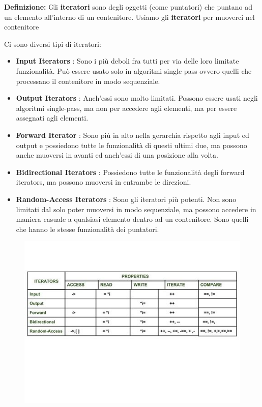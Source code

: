 \textsf{\small \textbf{Definizione: } Gli \textbf{iteratori} sono degli oggetti (come puntatori) che puntano ad un elemento all'interno di un contenitore. Usiamo gli \textbf{iteratori} per muoverci nel contenitore } \break

\textsf{\small Ci sono diversi tipi di iteratori: } \\

\begin{itemize}
	\item \textsf{\small \textbf{Input Iterators} : Sono i più deboli fra tutti per via delle loro limitate funzionalità. Può essere usato solo in algoritmi single-pass ovvero quelli che processano il contenitore in modo sequenziale.}
	\item \textsf{\small \textbf{Output Iterators} : Anch'essi sono molto limitati. Possono essere usati negli algoritmi single-pass, ma non per accedere agli elementi, ma per essere assegnati agli elementi.}
	\item \textsf{\small \textbf{Forward Iterator} : Sono più in alto nella gerarchia rispetto agli input ed output e possiedono tutte le funzionalità di questi ultimi due, ma possono anche muoversi in avanti ed anch'essi di una posizione alla volta.}
	\item \textsf{\small \textbf{Bidirectional Iterators} : Possiedono tutte le funzionalità degli forward iterators, ma possono muoversi in entrambe le direzioni.}
	\item \textsf{\small \textbf{Random-Access Iterators} : Sono gli iteratori più potenti. Non sono limitati dal solo poter muoversi in modo sequenziale, ma possono accedere in maniera casuale a qualsiasi elemento dentro ad un contenitore. Sono quelli che hanno le stesse funzionalità dei puntatori.}
\end{itemize}

\pagebreak

\begin{figure}[H]
	\centering
	\includegraphics[width=1.2\textwidth, height=1.2\textheight, keepaspectratio]{./imgs/iterators.jpg}
	\label{fig:iterators}
\end{figure}

